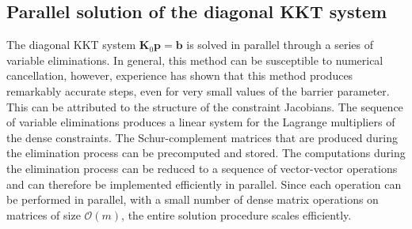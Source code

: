 \documentclass[12pt]{article}
\newcommand{\mb}{\mathbf}
\begin{document}
\subsection{Parallel solution of the diagonal KKT system}

The diagonal KKT system $\mb{K}_{0} \mb{p} = \mb{b}$ is solved in parallel through a series of variable eliminations. 
In general, this method can be susceptible to numerical cancellation, however, experience has shown that this method produces remarkably accurate steps, even for very small values of the barrier parameter.  
This can be attributed to the structure of the constraint Jacobians.
The sequence of variable eliminations produces a linear system for the Lagrange multipliers of the dense constraints.  
The Schur-complement matrices that are produced during the elimination process can be precomputed and stored.
The computations during the elimination process can be reduced to a sequence of vector-vector operations and can therefore be implemented efficiently in parallel. 
Since each operation can be performed in parallel, with a small number of dense matrix operations on matrices of size $\mathcal{O}(m)$, the entire solution procedure scales efficiently.
\end{document}

